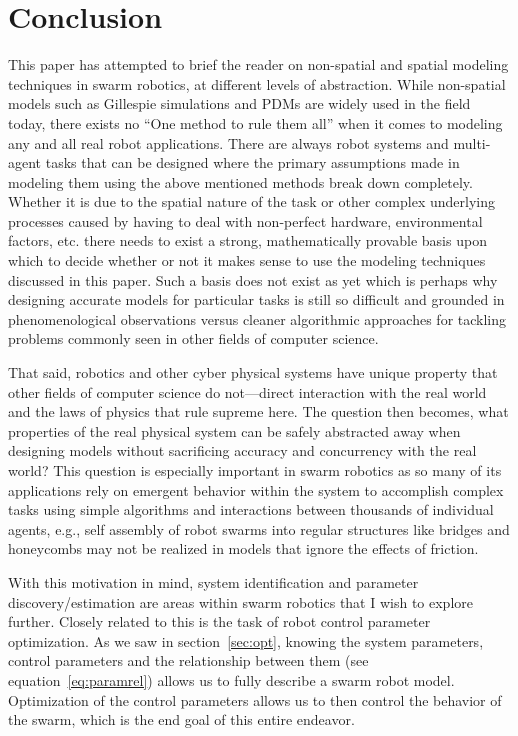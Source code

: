 \documentclass[Main.tex]{subfiles}
\begin{document}
\section{Conclusion}
This paper has attempted to brief the reader on non-spatial and spatial modeling techniques in swarm robotics, at different levels of abstraction. While non-spatial models such as Gillespie simulations and PDMs are widely used in the field today, there exists no ``One method to rule them all'' when it comes to modeling any and all real robot applications. There are always robot systems and multi-agent tasks that can be designed where the primary assumptions made in modeling them using the above mentioned methods break down completely. Whether it is due to the spatial nature of the task or other complex underlying processes caused by having to deal with non-perfect hardware, environmental factors, etc. there needs to exist a strong, mathematically provable basis upon which to decide whether or not it makes sense to use the modeling techniques discussed in this paper. Such a basis does not exist as yet which is perhaps why designing accurate models for particular tasks is still so difficult and grounded in phenomenological observations versus cleaner algorithmic approaches for tackling problems commonly seen in other fields of computer science.

That said, robotics and other cyber physical systems have unique property that other fields of computer science do not---direct interaction with the real world and the laws of physics that rule supreme here. The question then becomes, what properties of the real physical system can be safely abstracted away when designing models without sacrificing accuracy and concurrency with the real world? This question is especially important in swarm robotics as so many of its applications rely on emergent behavior within the system to accomplish complex tasks using simple algorithms and interactions between thousands of individual agents\cite{Hamann2012}, e.g., self assembly of robot swarms into regular structures like bridges and honeycombs may not be realized in models that ignore the effects of friction.

With this motivation in mind, system identification and parameter discovery/estimation are areas within swarm robotics that I wish to explore further. Closely related to this is the task of robot control parameter optimization. As we saw in section~\ref{sec:opt}, knowing the system parameters, control parameters and the relationship between them (see equation~\eqref{eq:paramrel}) allows us to fully describe a swarm robot model. Optimization of the control parameters allows us to then control the behavior of the swarm, which is the end goal of this entire endeavor. 
\end{document}
